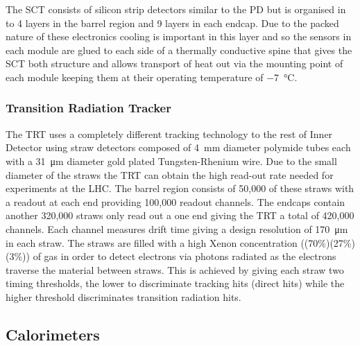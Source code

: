 		The SCT consists of silicon strip detectors similar to the PD but is organised in to 4 layers in the barrel region and 9 layers in each endcap. Due to the packed nature of these electronics cooling is important in this layer and so the sensors in each module are glued to each side of a thermally conductive spine that gives the SCT both structure and allows transport of heat out via the mounting point of each module keeping them at their operating temperature of \SI{-7}{\degreeCelsius}.



		\subsubsection*{Transition Radiation Tracker}

		The TRT uses a completely different tracking technology to the rest of Inner Detector using straw detectors composed of 4~mm diameter polymide tubes each with a \SI{31}{\um} diameter gold plated Tungsten-Rhenium wire. Due to the small diameter of the straws the TRT can obtain the high read-out rate needed for experiments at the LHC. The barrel region consists of 50,000 of these straws with a readout at each end providing 100,000 readout channels. The endcaps contain another 320,000 straws only read out a one end giving the TRT a total of 420,000 channels. Each channel measures drift time giving a design resolution of \SI{170}{\um} in each straw. The straws are filled with a high Xenon concentration ((70\%)(27\%)(3\%)) of gas in order to detect electrons via photons radiated as the electrons traverse the material between straws. This is achieved by giving each straw two timing thresholds, the lower to discriminate tracking hits (direct hits) while the higher threshold discriminates transition radiation hits.  %
		



	\subsection{Calorimeters}

